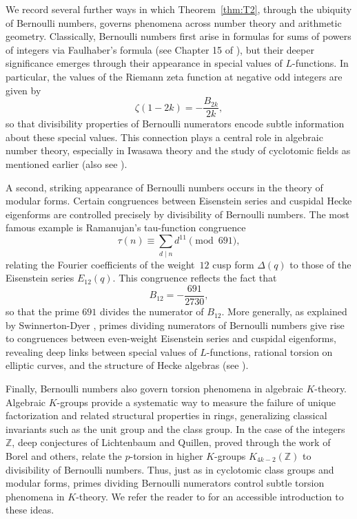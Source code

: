 \documentclass[12pt]{amsart}
\theoremstyle{plain}
\theoremstyle{definition}
\newcommand{\ZZ}{\mathbb{Z}}
\begin{document}
\medskip
We record several further ways in which Theorem~\ref{thm:T2}, through the ubiquity of Bernoulli
numbers, governs phenomena across number theory and arithmetic geometry.
Classically, Bernoulli numbers first arise in formulas for sums of
powers of integers via Faulhaber's formula (see Chapter 15 of \cite{IrelandRosen}), but their deeper
significance emerges through their appearance in special values of
$L$-functions. In particular, the values of the Riemann zeta function at
negative odd integers are given by
\[
\zeta(1-2k) = -\frac{B_{2k}}{2k},
\]
so that divisibility properties of Bernoulli numerators encode subtle
information about these special values. This connection plays a central
role in algebraic number theory, especially in Iwasawa theory and the
study of cyclotomic fields as mentioned earlier (also see \cite[Chapter~5]{Washington1997}).

A second, striking appearance of Bernoulli numbers occurs in the theory
of modular forms. Certain congruences between Eisenstein series and
cuspidal Hecke eigenforms are controlled precisely by divisibility of
Bernoulli numbers. The most famous example is Ramanujan's tau-function congruence
\[
\tau(n) \equiv \sum_{d\mid n}d^{11} \pmod{691},
\]
relating the Fourier coefficients of the weight~$12$ cusp form
$\Delta(q)$ to those of the Eisenstein series $E_{12}(q)$. This congruence
reflects the fact that
\[
B_{12} = -\frac{691}{2730},
\]
so that the prime $691$ divides the numerator of $B_{12}$. More
generally, as explained by Swinnerton-Dyer \cite{SwinnertonDyer}, primes dividing numerators of
Bernoulli numbers give rise to congruences between even-weight Eisenstein
series and cuspidal eigenforms, revealing deep links between special
values of $L$-functions, rational torsion on elliptic curves,
and the structure of Hecke algebras (see \cite{DiamondShurman2005, Mazur1977, OnoCBMS}).

Finally, Bernoulli numbers also govern torsion phenomena in algebraic
$K$-theory. Algebraic $K$-groups provide a systematic way to measure the
failure of unique factorization and related structural properties in
rings, generalizing classical invariants such as the unit group and the
class group. In the case of the integers $\ZZ$, deep conjectures of
Lichtenbaum and Quillen, proved through the work of Borel and others,
relate the $p$-torsion in higher $K$-groups $K_{4k-2}(\ZZ)$ to divisibility
of Bernoulli numbers. Thus, just as in cyclotomic class groups and
modular forms, primes dividing Bernoulli numerators control subtle
torsion phenomena in $K$-theory. We refer the reader to
\cite[Chapter~18]{Weibel2013} for an accessible introduction to these ideas.
\end{document}
